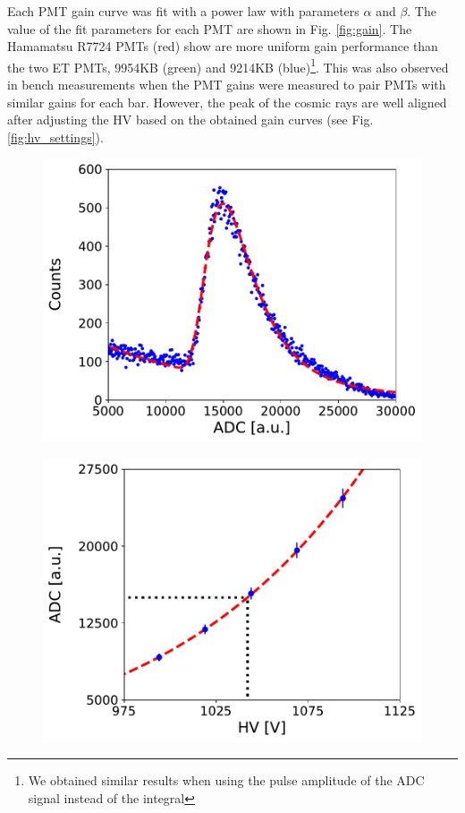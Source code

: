 \documentclass[3p,final,twocolumn]{elsarticle}
\begin{document}
Each PMT gain curve was fit with a power law with parameters $\alpha$ and $\beta$. The value of the fit parameters for each PMT are shown in Fig. \ref{fig:gain}. The Hamamatsu R7724 PMTs (red) show are more uniform gain performance than the two ET PMTs, 9954KB (green) and 9214KB (blue)\footnote{We obtained similar results when using the pulse amplitude of the ADC signal instead of the integral}. This was also observed in bench measurements when the PMT gains were measured to pair PMTs with similar gains for each bar.
However, the peak of the cosmic rays are well aligned after adjusting the HV based on the obtained gain curves (see Fig. \ref{fig:hv_settings}).
\begin{figure}[th]
	\centering
		\begin{minipage}{0.48\textwidth}
			\includegraphics[width=\textwidth]{adc-fit-example.pdf}
					\subcaption{}
			\label{fig:adc-spectrum}
		\end{minipage}
		\begin{minipage}{0.47\textwidth}
			\includegraphics[width=\textwidth]{gainfit.pdf}

\end{minipage}
\end{figure}
\end{document}
